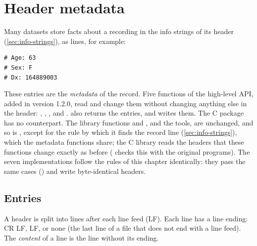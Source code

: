\chapter{Header metadata}
\label{chap:metadata}

Many datasets store facts about a recording in the info strings of its
header (\cref{sec:info-strings}), as  lines, for example:
\begin{lstlisting}[style=text]
# Age: 63
# Sex: F
# Dx: 164889003
\end{lstlisting}
These entries are the \emph{metadata} of the record. Five functions of the
high-level API, added in version 1.2.0, read and change them without
changing anything else in the header: ,
, ,  and
.  also returns the entries, and
 writes them. The C package has no counterpart. The
library functions  and , and the tools, are
unchanged, and so is , except for the rule by which it finds
the record line (\cref{sec:info-strings}), which the metadata functions
share; the C library reads the headers that these functions change exactly
as before ( checks this with the original
programs). The seven implementations follow the
rules of this chapter identically: they pass the same cases
() and write byte-identical headers.

\section{Entries}
\label{sec:metadata-entries}

A header is split into lines after each line feed (LF). Each line has a line
ending: CR LF, LF, or none (the last line of a file that does not end with a
line feed). The \emph{content} of a line is the line without its ending.

